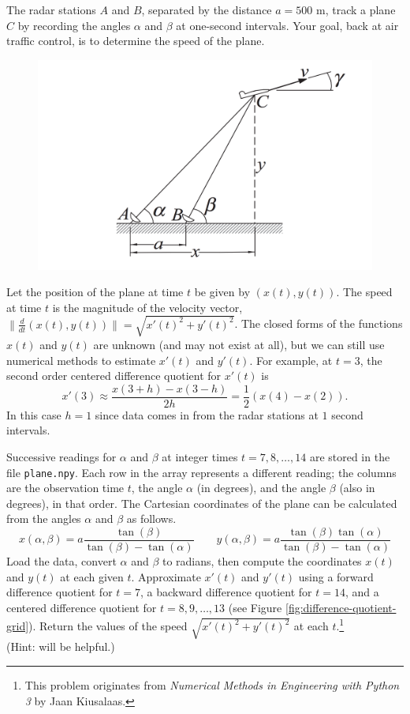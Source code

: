 \begin{problem}
The radar stations $A$ and $B$, separated by the distance $a = 500$ m, track a plane $C$ by recording the angles $\alpha$ and $\beta$ at one-second intervals.
Your goal, back at air traffic control, is to determine the speed of the plane.
%
\begin{figure}[H]
    \includegraphics[width=.5\textwidth]{figures/plane_diagram.png}
\end{figure}
%
Let the position of the plane at time $t$ be given by $(x(t),y(t))$.
The speed at time $t$ is the magnitude of the velocity vector, $\|\frac{d}{dt}(x(t),y(t))\| = \sqrt{x'(t)^2 + y'(t)^2}$.
The closed forms of the functions $x(t)$ and $y(t)$ are unknown (and may not exist at all), but we can still use numerical methods to estimate $x'(t)$ and $y'(t)$.
For example, at $t=3$, the second order centered difference quotient for $x'(t)$ is
\[
x'(3) \approx \frac{x(3+h) - x(3-h)}{2h} = \frac{1}{2}(x(4) - x(2)).
\]
In this case $h=1$ since data comes in from the radar stations at $1$ second intervals.

Successive readings for $\alpha$ and $\beta$ at integer times $t=7,8,\ldots,14$ are stored in the file \texttt{plane.npy}.
Each row in the array represents a different reading; the columns are the observation time $t$, the angle $\alpha$ (in degrees), and the angle $\beta$ (also in degrees), in that order.
The Cartesian coordinates of the plane can be calculated from the angles $\alpha$ and $\beta$ as follows.
\[
x(\alpha, \beta) = a \frac{\tan(\beta)}{\tan(\beta)-\tan(\alpha)}
\qquad
y(\alpha, \beta) = a \frac{\tan(\beta)\tan(\alpha)}{\tan(\beta)-\tan(\alpha)}
\]
Load the data, convert $\alpha$ and $\beta$ to radians, then compute the coordinates $x(t)$ and $y(t)$ at each given $t$.
Approximate $x'(t)$ and $y'(t)$ using a forward difference quotient for $t=7$, a backward difference quotient for $t=14$, and a centered difference quotient for $t=8,9,\ldots,13$ (see Figure \ref{fig:difference-quotient-grid}).
Return the values of the speed $\sqrt{x'(t)^2+y'(t)^2}$ at each $t$.\footnote{This problem originates from \emph{Numerical Methods in Engineering with Python 3} by Jaan Kiusalaas.}
\\(Hint:  will be helpful.)
\end{problem}

